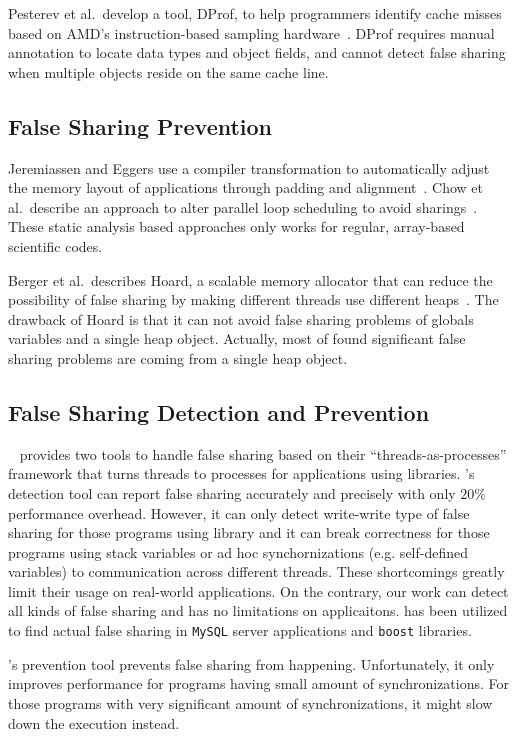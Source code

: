 Pesterev et al.\ develop a tool, DProf, to help programmers identify cache misses based on
AMD's instruction-based sampling hardware~\cite{DProf}.
DProf requires manual annotation to locate data types and object fields, and cannot detect false
sharing when multiple objects reside on the same cache line.

\subsection{False Sharing Prevention}
Jeremiassen and Eggers use a compiler transformation to automatically adjust the
memory layout of applications through padding and alignment~\cite{falseshare:compile}.
Chow et al.\ describe an approach to alter parallel loop scheduling to avoid
sharings~\cite{falseshare:schedule}.
These static analysis based approaches only works for regular,
array-based scientific codes.

Berger et al.\ describes Hoard, a scalable memory allocator that can reduce
the possibility of false sharing
by making different threads use different heaps~\cite{Hoard}.
The drawback of Hoard is that it can not avoid false sharing problems of globals variables 
and a single heap object.
Actually, most of found significant false sharing problems are coming from a single heap object. 

\subsection{False Sharing Detection and Prevention}
\sheriff{}~\cite{sheriff} provides two tools to handle false sharing based on 
their ``threads-as-processes'' framework that turns threads to processes for applications using 
\pthreads{} libraries.
\Sheriff{}'s detection tool 
can report false sharing accurately and precisely with only $20\%$ performance overhead.
However, it can only detect write-write type of false sharing for those programs 
using \pthreads{} library and it can break correctness for those programs using 
stack variables or ad hoc synchornizations (e.g. self-defined variables)
to communication across different threads.
These shortcomings greatly limit their usage on real-world applications.  
On the contrary, our work can detect all kinds of false sharing and has no limitations on applicaitons.
\Predator{} has been utilized to find actual false sharing in \texttt{MySQL} server applications 
and \texttt{boost} libraries.

\Sheriff{}'s prevention tool prevents false sharing from happening. 
Unfortunately, it only improves performance for programs having small amount of synchronizations. 
For those programs with very significant 
amount of synchronizations, it might slow down the execution instead.

